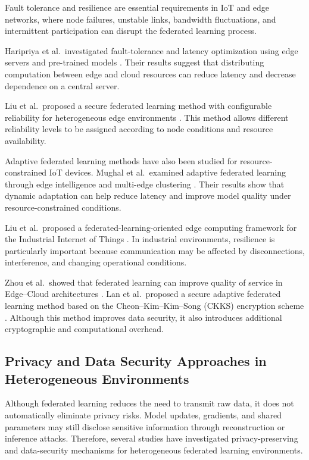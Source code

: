 \documentclass[5p,times,numafflabel]{elsarticle}
\begin{document}
	Fault tolerance and resilience are essential requirements in IoT and
	edge networks, where node failures, unstable links, bandwidth
	fluctuations, and intermittent participation can disrupt the
	federated learning process.
	
	Haripriya et al.\ investigated fault-tolerance and latency
	optimization using edge servers and pre-trained models
	\cite{haripriya2025fault}. Their results suggest that distributing
	computation between edge and cloud resources can reduce latency and
	decrease dependence on a central server.
	
	Liu et al.\ proposed a secure federated learning method with
	configurable reliability for heterogeneous edge environments
	\cite{liu2026reliability}. This method allows different reliability
	levels to be assigned according to node conditions and resource
	availability.
	
	Adaptive federated learning methods have also been studied for
	resource-constrained IoT devices. Mughal et al.\ examined adaptive
	federated learning through edge intelligence and multi-edge
	clustering \cite{mughal2024adaptive}. Their results show that dynamic
	adaptation can help reduce latency and improve model quality under
	resource-constrained conditions.
	
	Liu et al.\ proposed a federated-learning-oriented edge computing
	framework for the Industrial Internet of Things
	\cite{liu2024iiot}. In industrial environments, resilience is
	particularly important because communication may be affected by
	disconnections, interference, and changing operational conditions.
	
	Zhou et al.\ showed that federated learning can improve quality of
	service in Edge--Cloud architectures \cite{zhou2024qos}. Lan et al.\
	proposed a secure adaptive federated learning method based on the
	Cheon--Kim--Kim--Song (CKKS) encryption scheme
	\cite{lan2025ckks}. Although this method improves data security, it
	also introduces additional cryptographic and computational overhead.
	
	\subsection{Privacy and Data Security Approaches in
		Heterogeneous Environments}
	\label{subsec:privacy-security}
	
	Although federated learning reduces the need to transmit raw data,
	it does not automatically eliminate privacy risks. Model updates,
	gradients, and shared parameters may still disclose sensitive
	information through reconstruction or inference attacks. Therefore,
	several studies have investigated privacy-preserving and data-security
	mechanisms for heterogeneous federated learning environments.
	
\end{document}
